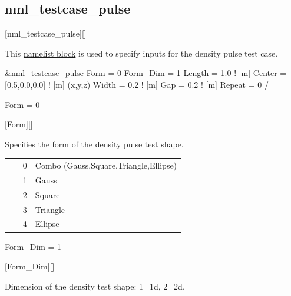 \subsection{nml\_testcase\_pulse}
\label{SEC:nml_testcase_pulse}
\inp*[nmlTestcasePulse]{}[nml\_testcase\_pulse][]

This \hyperref[SEC:User_Input]{namelist block}
is used to specify inputs for the density pulse test case.

\begin{nmlblocklst}[
,label={LST:nml_testcase_pulse}
,caption={Namelist nml\_testcase\_pulse.}
]
&nml_testcase_pulse
  Form     = 0
  Form_Dim = 1
  Length   = 1.0            ! [m]
  Center   = [0.5,0.0,0.0]  ! [m] (x,y,z)
  Width    = 0.2            ! [m]
  Gap      = 0.2            ! [m]
  Repeat   = 0
/
\end{nmlblocklst}
\newlength{\negPulseVspace}
\setlength{\negPulseVspace}{-3pt}


\begin{nmldescitem}
Form = 0
\end{nmldescitem}
[Form][]

\begin{nmldescbody}
Specifies the form of the density pulse test shape.
\\
\begin{tabular}{ @{\qquad} r @{ = } p{0.85\linewidth} @{} }
  0 & Combo (Gauss,Square,Triangle,Ellipse) \\
  1 & Gauss \\ 
  2 & Square \\
  3 & Triangle \\
  4 & Ellipse
\end{tabular}
\end{nmldescbody}


\begin{nmldescitem}
Form_Dim = 1
\end{nmldescitem}
[Form\_Dim][]

\begin{nmldescbody}
Dimension of the density test shape:
  1=1d,
  2=2d.
\end{nmldescbody}


